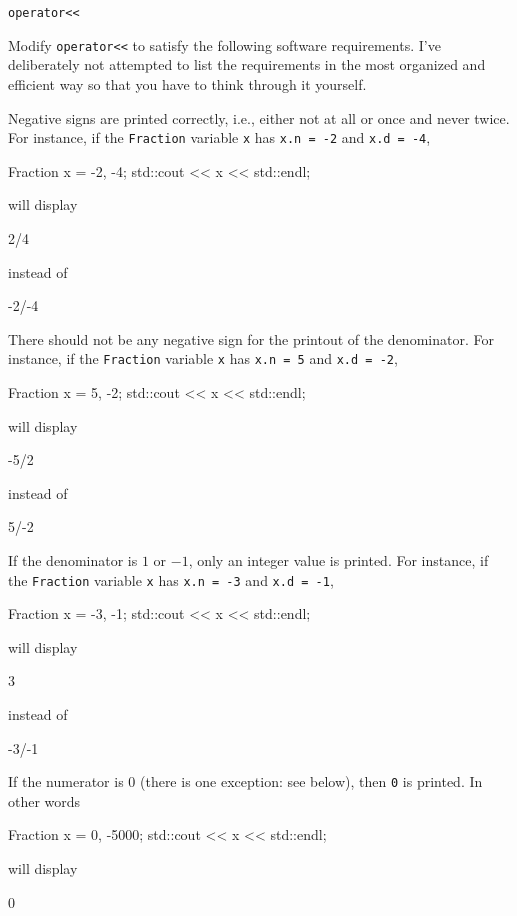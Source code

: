 \verb!operator<<!

Modify \verb!operator<<! to satisfy the following software requirements. I've
deliberately not attempted to list the requirements in the most organized and
efficient way so that you have to think through it yourself.

Negative signs are printed correctly, i.e., either not at all or once and never
twice. For instance, if the \verb!Fraction! variable \verb!x! has
\verb!x.n = -2! and \verb!x.d = -4!,
\begin{console}
Fraction x = {-2, -4};
std::cout << x << std::endl;
\end{console}
will display
\begin{console}
2/4
\end{console}
instead of
\begin{console}
-2/-4
\end{console}

There should not be any negative sign for the printout of the
denominator. For instance, if the \verb!Fraction! variable \verb!x! has
\verb!x.n = 5! and \verb!x.d = -2!, 
\begin{console}
Fraction x = {5, -2};
std::cout << x << std::endl;
\end{console}
will display
\begin{console}
-5/2
\end{console}
instead of
\begin{console}
5/-2
\end{console}

If the denominator is $1$ or $-1$, only an integer value is printed. For
instance, if the \verb!Fraction! variable \verb!x! has \verb!x.n = -3!
and \verb!x.d = -1!,
\begin{console}
Fraction x = {-3, -1};
std::cout << x << std::endl;
\end{console}
will display
\begin{console}
3
\end{console}
instead of
\begin{console}
-3/-1
\end{console}

If the numerator is $0$ (there is one exception: see below), then
\verb!0! is printed. In other words
\begin{console}
Fraction x = {0, -5000};
std::cout << x << std::endl;
\end{console}
will display
\begin{console}
0
\end{console}

